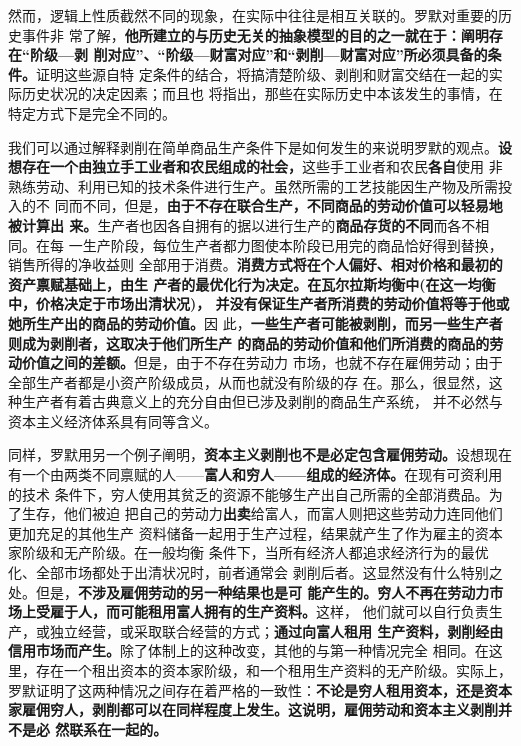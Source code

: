 然而，逻辑上性质截然不同的现象，在实际中往往是相互关联的。罗默对重要的历史事件非
常了解，\textbf{他所建立的与历史无关的抽象模型的目的之一就在于：阐明存在“阶级—剥
  削对应”、“阶级—财富对应”和“剥削—财富对应”所必须具备的条件。}证明这些源自特
定条件的结合，将搞清楚阶级、剥削和财富交结在一起的实际历史状况的决定因素；而且也
将指出，那些在实际历史中本该发生的事情，在特定方式下是完全不同的。

我们可以通过解释剥削在简单商品生产条件下是如何发生的来说明罗默的观点。\textbf{设
  想存在一个由独立手工业者和农民组成的社会，}这些手工业者和农民\textbf{各自}使用
非熟练劳动、利用已知的技术条件进行生产。虽然所需的工艺技能因生产物及所需投入的不
同而不同，但是，\textbf{由于不存在联合生产，不同商品的劳动价值可以轻易地被计算出
  来。}生产者也因各自拥有的据以进行生产的\textbf{商品存货的不同}而各不相同。在每
一生产阶段，每位生产者都力图使本阶段已用完的商品恰好得到替换，销售所得的净收益则
全部用于消费。\textbf{消费方式将在个人偏好、相对价格和最初的资产禀赋基础上，由生
  产者的最优化行为决定。在瓦尔拉斯均衡中(在这一均衡中，价格决定于市场出清状况)，
  并没有保证生产者所消费的劳动价值将等于他或她所生产出的商品的劳动价值。}因
此，\textbf{一些生产者可能被剥削，而另一些生产者则成为剥削者，这取决于他们所生产
  的商品的劳动价值和他们所消费的商品的劳动价值之间的差额。}但是，由于不存在劳动力
市场，也就不存在雇佣劳动；由于全部生产者都是小资产阶级成员，从而也就没有阶级的存
在。那么，很显然，这种生产者有着古典意义上的充分自由但已涉及剥削的商品生产系统，
并不必然与资本主义经济体系具有同等含义。

同样，罗默用另一个例子阐明，\textbf{资本主义剥削也不是必定包含雇佣劳动。}设想现在
有一个由两类不同禀赋的人——\textbf{富人和穷人——组成的经济体。}在现有可资利用的技术
条件下，穷人使用其贫乏的资源不能够生产出自己所需的全部消费品。为了生存，他们被迫
把自己的劳动力\textbf{出卖}给富人，而富人则把这些劳动力连同他们更加充足的其他生产
资料储备一起用于生产过程，结果就产生了作为雇主的资本家阶级和无产阶级。在一般均衡
条件下，当所有经济人都追求经济行为的最优化、全部市场都处于出清状况时，前者通常会
剥削后者。这显然没有什么特别之处。但是，\textbf{不涉及雇佣劳动的另一种结果也是可
  能产生的。穷人不再在劳动力市场上受雇于人，而可能租用富人拥有的生产资料。}这样，
他们就可以自行负责生产，或独立经营，或采取联合经营的方式；\textbf{通过向富人租用
  生产资料，剥削经由信用市场而产生。}除了体制上的这种改变，其他的与第一种情况完全
相同。在这里，存在一个租出资本的资本家阶级，和一个租用生产资料的无产阶级。实际上，
罗默证明了这两种情况之间存在着严格的一致性：\textbf{不论是穷人租用资本，还是资本
  家雇佣穷人，剥削都可以在同样程度上发生。这说明，雇佣劳动和资本主义剥削并不是必
  然联系在一起的。}

